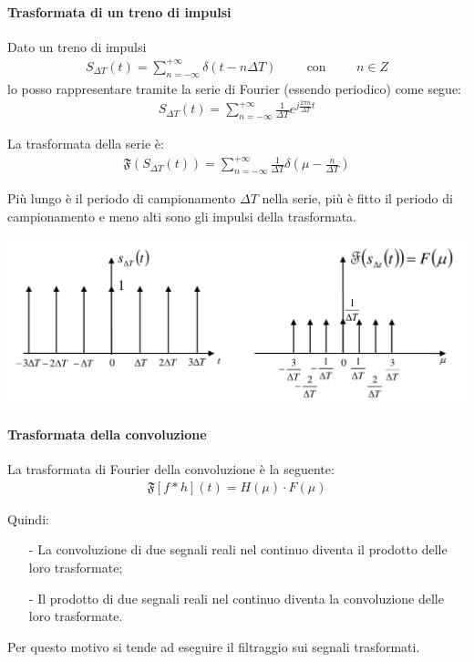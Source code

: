 \documentclass[a4paper, 10pt]{report}
\begin{document}
\paragraph*{Trasformata di un treno di impulsi} Dato un treno di impulsi
\begin{align*}
S_{\Delta T}(t) = \sum^{+\infty}_{n = -\infty} \delta(t - n\Delta T) \hspace{1cm} \text{con}\hspace{1cm} n \in Z
\end{align*}
\noindent lo posso rappresentare tramite la serie di Fourier (essendo periodico) come segue:
\begin{align*}
S_{\Delta T}(t) = \sum^{+\infty}_{n = -\infty} \frac{1}{\Delta T} e^{j \frac{2 \pi n}{\Delta T} t}
\end{align*}

\noindent La trasformata della serie è:
\begin{align*}
\mathfrak{F}(S_{\Delta T}(t)) = \sum^{+\infty}_{n = -\infty} \frac{1}{\Delta T} \delta \left(\mu - \frac{n}{\Delta T}\right)
\end{align*}

\noindent Più lungo è il periodo di campionamento $\Delta T$ nella serie, più è fitto il periodo di campionamento e meno alti sono gli impulsi della trasformata.

\begin{center}
\includegraphics[scale=0.4]{5.pdf}
\end{center}

\paragraph*{Trasformata della convoluzione} La trasformata di Fourier della convoluzione è la seguente:
\begin{align*}
\mathfrak{F}[f * h](t) = H(\mu) \cdot F(\mu)
\end{align*}

\noindent Quindi:
\begin{itemize}
\item[-] La convoluzione di due segnali reali nel continuo diventa il prodotto delle loro trasformate;
\item[-] Il prodotto di due segnali reali nel continuo diventa la convoluzione delle loro trasformate.
\end{itemize}

\noindent Per questo motivo si tende ad eseguire il filtraggio sui segnali trasformati.
\end{document}
